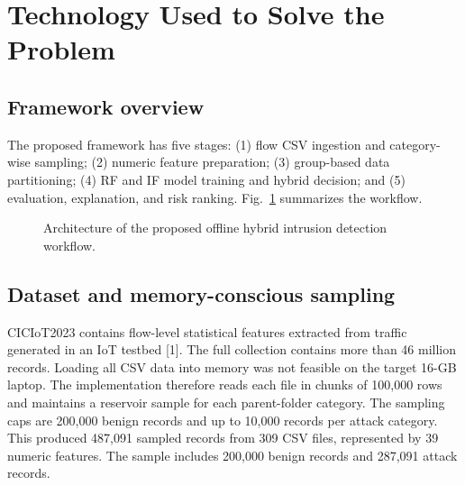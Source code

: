 \documentclass[runningheads]{llncs}
\begin{document}
\section{Technology Used to Solve the Problem}
\subsection{Framework overview}
The proposed framework has five stages: (1) flow CSV ingestion and category-wise sampling; (2) numeric feature preparation; (3) group-based data partitioning; (4) RF and IF model training and hybrid decision; and (5) evaluation, explanation, and risk ranking. Fig.~\ref{fig:pipeline} summarizes the workflow.

\begin{figure}[t]
\centering
{}
\caption{Architecture of the proposed offline hybrid intrusion detection workflow.}
\label{fig:pipeline}
\end{figure}

\subsection{Dataset and memory-conscious sampling}
CICIoT2023 contains flow-level statistical features extracted from traffic generated in an IoT testbed [1]. The full collection contains more than 46 million records. Loading all CSV data into memory was not feasible on the target 16-GB laptop. The implementation therefore reads each file in chunks of 100,000 rows and maintains a reservoir sample for each parent-folder category. The sampling caps are 200,000 benign records and up to 10,000 records per attack category. This produced 487,091 sampled records from 309 CSV files, represented by 39 numeric features. The sample includes 200,000 benign records and 287,091 attack records.
\end{document}
